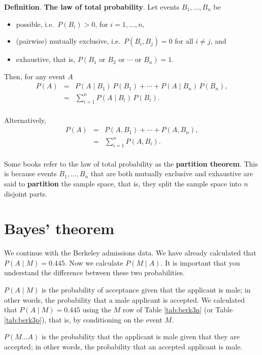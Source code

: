 \documentclass[
  british,
  11pt,
  openany, a4paper]{book}
\providecommand{\tightlist}{%
  \setlength{\itemsep}{0pt}\setlength{\parskip}{0pt}}
\begin{document}
\textbf{Definition}. \textbf{The law of total probability}. Let events \(B_1, \ldots, B_n\) be

\begin{itemize}
\tightlist
\item
  possible, i.e.~\(P(B_i) > 0\), for \(i = 1, \ldots, n\),
\item
  (pairwise) mutually exclusive, i.e.~\(P(B_i , B_j)=0\) for all \(i \neq j\), and
\item
  exhaustive, that is, \(P(B_1 \text{ or } B_2 \text{ or } \cdots \text{ or } B_n) = 1\).
\end{itemize}

Then, for any event \(A\)
\begin{eqnarray*}
P(A) &=& P(A \mid B_1)\,P(B_1) + \cdots + P(A \mid B_n)\,P(B_n), \\
     &=& \displaystyle\sum_{i=1}^n P(A \mid B_i)\,P(B_i). \\
\end{eqnarray*}

Alternatively,
\begin{eqnarray*}
P(A) &=& P(A, B_1) + \cdots + P(A, B_n), \\
     &=& \displaystyle\sum_{i=1}^n P(A, B_i). \\
\end{eqnarray*}

Some books refer to the law of total probability as the \textbf{partition theorem}. This is because events \(B_1, \ldots, B_n\) that are both mutually exclusive and exhaustive are said to \textbf{partition} the sample space, that is, they split the sample space into \(n\) disjoint parts.

\section{Bayes' theorem}\label{bayes-theorem}

We continue with the Berkeley admissions data. We have already calculated that \(P(A \mid M) = 0.445\). Now we calculate \(P(M \mid A)\). It is important that you understand the difference between these two probabilities.

\(P(A \mid M)\) is the probability of acceptance given that the applicant is male; in other words, the probability that a male applicant is accepted. We calculated that \(P(A \mid M)=0.445\) using the \(M\) row of Table \ref{tab:berk3n} (or Table \ref{tab:berk3p}), that is, by conditioning on the event \(M\).

\(P(M \ldots A)\) is the probability that the applicant is male given that they are accepted; in other words, the probability that an accepted applicant is male.
\end{document}
